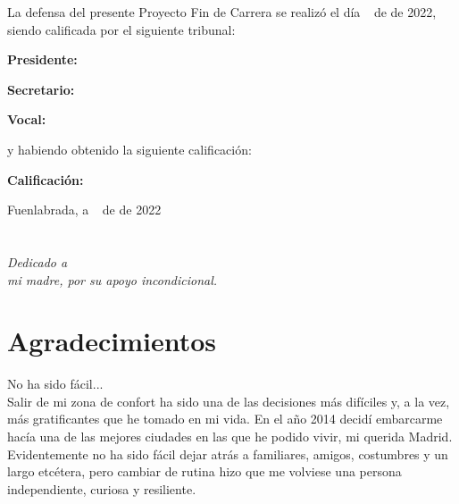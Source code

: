 \documentclass[a4paper, 12pt]{book}
\begin{document}
\vspace{1cm}
La defensa del presente Proyecto Fin de Carrera se realizó el día \qquad$\;\,$ de \qquad\qquad\qquad\qquad \newline de 2022, siendo calificada por el siguiente tribunal:


\vspace{0.5cm}
\textbf{Presidente:}

\vspace{1.2cm}
\textbf{Secretario:}

\vspace{1.2cm}
\textbf{Vocal:}



\vspace{1.2cm}
y habiendo obtenido la siguiente calificación:

\vspace{1cm}
\textbf{Calificación:}


\vspace{1cm}
\begin{flushright}
Fuenlabrada, a \qquad$\;\,$ de \qquad\qquad\qquad\qquad de 2022
\end{flushright}


\chapter*{}
\begin{flushright}
\textit{Dedicado a \\
mi madre, por su apoyo incondicional.}
\end{flushright}


\chapter*{Agradecimientos}
No ha sido fácil...\\

Salir de mi zona de confort ha sido una de las decisiones más difíciles y, a la vez, más gratificantes que he tomado en mi vida. En el año 2014 decidí embarcarme hacía una de las mejores ciudades en las que he podido vivir, mi querida Madrid. Evidentemente no ha sido fácil dejar atrás a familiares, amigos, costumbres y un largo etcétera, pero cambiar de rutina hizo que me volviese una persona independiente, curiosa y resiliente. 
\end{document}
